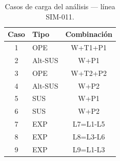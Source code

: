 \begin{table}[htbp]
  \centering
  \small
  \caption{Casos de carga del análisis — línea SIM-011.}
  \label{tab:casos}
  \begin{tabular}{clc}
    \toprule
    Caso & Tipo & Combinaci\'on \\
    \midrule
    1 & OPE & W+T1+P1 \\
    2 & Alt-SUS & W+P1 \\
    3 & OPE & W+T2+P2 \\
    4 & Alt-SUS & W+P2 \\
    5 & SUS & W+P1 \\
    6 & SUS & W+P2 \\
    7 & EXP & L7=L1-L5 \\
    8 & EXP & L8=L3-L6 \\
    9 & EXP & L9=L1-L3 \\
    \bottomrule
  \end{tabular}
\end{table}
